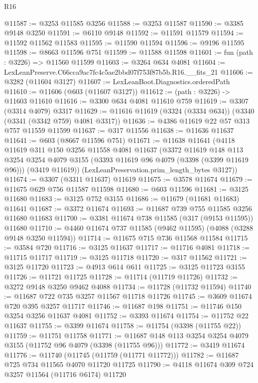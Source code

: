 \begin{lexlean}{R16}
\begin{coremodule}
@11587 := @3253 @11585 @3256
@11588 := @3253 @11587
@11590 := @3385 @9148 @3250
@11591 := @6110 @9148
@11592 := @11591 @11579
@11594 := @11592 @11562 @11583
@11595 := @11590 @11594
@11596 := @9196 @11595
@11598 := @8663 @11596 @751
@11599 := @11588 @11598
@11601 := fun (path : @3226) => @11560 @11599
@11603 := @3264 @634 @4081
@11604 := LexLeanPreserve.C66cca9ac7fc4c5ae2bbd07f753f87b5b.R16.__fits_21
@11606 := @3282 (@11604 @3127)
@11607 := LexLeanBoot.Diagnostics.orderedPath
@11610 := @11606 (@603 (@11607 @3127))
@11612 := (path : @3226) -> @11603 @11610
@11616 := @3300 @634 @4081 @11610 @759
@11619 := @3307 (@3314 @4079) @3317
@11629 := @11616 @11619 (@3324 (@3334 @634)) (@3340 (@3341 (@3342 @759) @4081 @3317))
@11636 := @4386 @11619 @22 @57 @313 @757 @11559 @11599
@11637 := @317 @11556
@11638 := @11636 @11637
@11641 := @603 (@8667 @11596 @751)
@11671 := @11638
    @11641
    (@4118
      @11619
      @311
      @150
      @3256
      @11558
      @4081
      @11637
      (@3372
        @11619
        @148
        @113
        @3254
        @3254
        @4079
        @3155
        (@3393 @11619 @96 @4079 (@3398 (@3399 @11619 @96)))
        (@3419 @11619))
      (LexLeanPreservation.prim_length_bytes @3127))
@11674 := @3307 (@3311 @11637) @11619
@11675 := @3578 @11674
@11679 := @11675 @629 @756 @11587 @11598
@11680 := @603 @11596
@11681 := @3125 @11680
@11683 := @3125 @752 @3155
@11686 := @11679 (@11681 @11683) @11641
@11687 := @3372 @11674
@11693 := @11687 @739 @755 @11585 @3256 @11680 @11683
@11700 := @3381 @11674 @738 @11585 (@317 (@9153 @11595)) @11680
@11710 := @4460 @11674 @737 @11585 (@9462 @11595) (@4088 (@3288 @9148 @3250 @11594))
@11714 := @11675 @715 @736 @11568 @11584
@11715 := @3584 @720
@11716 := @3125 @11637
@11717 := @11716 @4081
@11718 := @11715 @11717
@11719 := @3125 @11718
@11720 := @317 @11562
@11721 := @3125 @11720
@11723 := @4913 @614 @611
@11725 := @3125 @11723 @3155
@11726 := @11721 @11725
@11728 := @11714 (@11719 @11726)
@11732 := @3272 @9148 @3250 @9462 @4088
@11734 := @11728 (@11732 @11594)
@11740 := @11687 @722 @735 @3257 @11567 @11718 @11726
@11745 := @3609 @11674 @720 @395 @3257 @11717
@11746 := @11687 @198
@11751 := @11746 @150 @3254 @3256 @11637 @4081
@11752 := @3393 @11674
@11754 := @11752 @22 @11637
@11755 := @3399 @11674
@11758 := @11754 (@3398 (@11755 @22))
@11759 := @11751 @11758
@11771 := @11687 @148 @113 @3254 @3254 @4079 @3155 (@11752 @96 @4079 (@3398 (@11755 @96)))
@11772 := @3419 @11674
@11776 := @11740 (@11745 (@11759 (@11771 @11772)))
@11782 := @11687 @725 @734 @11565 @4070 @11720 @11725
@11790 := @4118 @11674 @309 @724 @3257 @11564 (@11716 @6174) @11720

\end{coremodule}
\end{lexlean}
